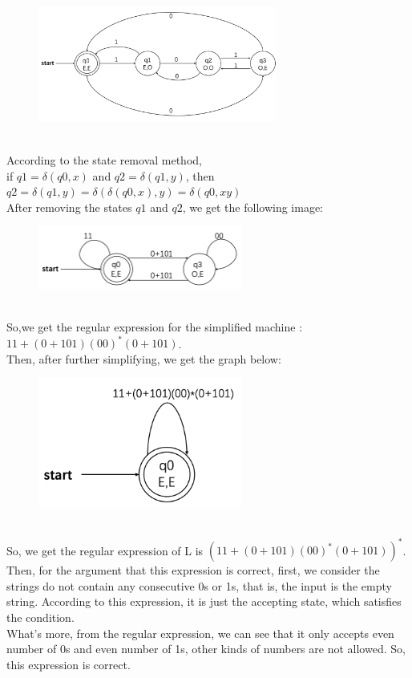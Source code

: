 \documentclass[12pt,a4paper]{article}
\newcommand{\question}[1]{\bigskip\noindent{\textbf{Q{#1} solution}}}
\begin{document}
\newpage

\begin{figure}
  \centering
  \includegraphics[width = 0.7\textwidth]{img/374hw2.png}
\end{figure}

\question{5.B}
\\According to the state removal method, 
\\if $q1=\delta(q0,x)$ and $q2=\delta(q1,y)$, then $q2=\delta(q1,y)=
\delta(\delta(q0,x),y)=\delta(q0,xy)$
\\After removing the states $q1$ and $q2$, we get the following image:
\begin{figure}
  \centering
  \includegraphics[width = 0.6\textwidth]{img/hw2_2.png}
\end{figure}
\\So,we get the regular expression for the simplified machine : $11+(0+101)(00)^\ast (0+101)$.
\\Then, after further simplifying, we get the graph below:
\begin{figure}
  \centering
  \includegraphics[width = 0.6\textwidth]{img/hw2_3.png}
\end{figure}
\\So, we get the regular expression of L is $(11+(0+101)(00)^\ast (0+101))^\ast$.
\\Then, for the argument that this expression is correct, first, we consider the strings
do not contain any consecutive 0s or 1s, that is, the input is the empty string. According 
to this expression, it is just the accepting state, which satisfies the condition.
\\What's more, from the regular expression, we can see that it only accepts even number of 0s
and even number of 1s, other kinds of numbers are not allowed. So, this expression is correct.
\end{document}
